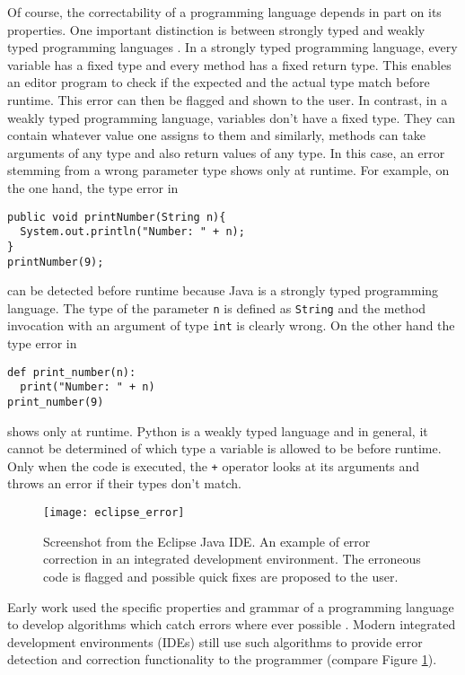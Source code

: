 Of course, the correctability of a programming language depends in part on its properties. One important distinction is between strongly typed and weakly typed programming languages \cite{pl_typing}. In a strongly typed programming language, every variable has a fixed type and every method has a fixed return type. This enables an editor program to check if the expected and the actual type match before runtime. This error can then be flagged and shown to the user. In contrast, in a weakly typed programming language, variables don't have a fixed type. They can contain whatever value one assigns to them and similarly, methods can take arguments of any type and also return values of any type. In this case, an error stemming from a wrong parameter type shows only at runtime. For example, on the one hand, the type error in

\begin{lstlisting}[style=inline]
public void printNumber(String n){
  System.out.println("Number: " + n);
}
printNumber(9);
\end{lstlisting}

\noindent can be detected before runtime because Java is a strongly typed programming language. The type of the parameter \texttt{n} is defined as \texttt{String} and the method invocation with an argument of type \texttt{int} is clearly wrong. On the other hand the type error in

\lstset{language=Python}
\begin{lstlisting}[style=inline]
def print_number(n):
  print("Number: " + n)
print_number(9)
\end{lstlisting}
\lstset{language=Java}

\noindent shows only at runtime. Python is a weakly typed language and in general, it cannot be determined of which type a variable is allowed to be before runtime. Only when the code is executed, the \texttt{+} operator looks at its arguments and throws an error if their types don't match.

\begin{figure}[t]
\centering
\texttt{[image: eclipse\_error]}
\caption{Screenshot from the Eclipse Java IDE. An example of error correction in an integrated development environment. The erroneous code is flagged and possible quick fixes are proposed to the user.}
\label{ide_correction}
\end{figure}

Early work used the specific properties and grammar of a programming language to develop algorithms which catch errors where ever possible \cite{syntax_correction_in_pl, analysis_for_editors}. Modern integrated development environments (IDEs) still use such algorithms to provide error detection and correction functionality to the programmer (compare Figure \ref{ide_correction}).

